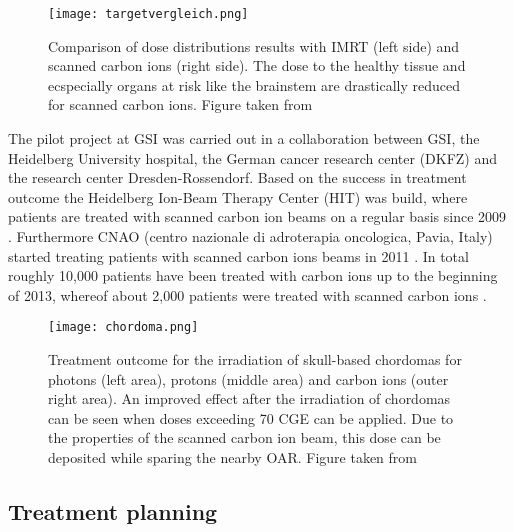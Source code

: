 \documentclass[type=dr, dr=rernat, accentcolor=tud7b,colorbacktitle, bigchapter, openright, twoside, 12pt ]{tudthesis}
\begin{document}
\begin{figure}[H]
\begin{center}
\texttt{[image: targetvergleich.png]}
\caption{Comparison of dose distributions results with IMRT (left side) and scanned carbon ions (right side). The dose to the healthy 
tissue and ecspecially organs at risk like the brainstem are drastically reduced for scanned carbon ions. Figure taken from \cite{Gro04}}
\label{targetvergleich}
\end{center}
\end{figure}

The pilot project at GSI was carried out in a collaboration between GSI, the Heidelberg University hospital, the German cancer research 
center (DKFZ) and the research center Dresden-Rossendorf. Based on the success in treatment outcome the Heidelberg Ion-Beam Therapy 
Center (HIT) was build, where patients are treated with scanned carbon ion beams on a regular basis since 2009 \cite{Com10}. 
Furthermore CNAO (centro nazionale di adroterapia oncologica, Pavia, Italy) started treating patients with scanned carbon ions beams 
in 2011 \cite{Ama04}. In total roughly 10,000 patients have been treated with carbon ions up to the beginning of 2013, whereof about 
2,000 patients were treated with scanned carbon ions \cite{PTCOG13}.

\begin{figure}[H]
\begin{center}
\texttt{[image: chordoma.png]}
\caption{Treatment outcome for the irradiation of skull-based chordomas for photons (left area), protons (middle area) and carbon ions (outer 
right area). An improved effect after the irradiation of chordomas can be seen when doses exceeding 70 CGE can be applied. Due to 
the properties of the scanned carbon ion beam, this dose can be deposited while sparing the nearby OAR. 
Figure taken from \cite{Sch07}}
\label{chordoma}
\end{center}
\end{figure}


\subsection{Treatment planning}
\end{document}
